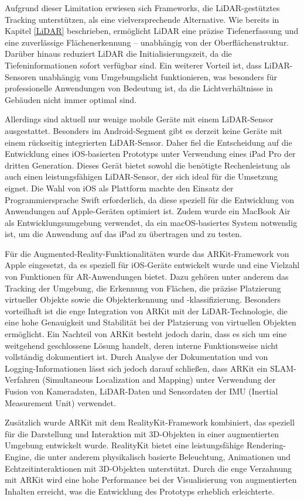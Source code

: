 Aufgrund dieser Limitation erwiesen sich Frameworks, die LiDAR-gestütztes Tracking unterstützen, als eine vielversprechende Alternative. Wie bereits in Kapitel \ref{LiDAR} beschrieben, ermöglicht LiDAR eine präzise Tiefenerfassung und eine zuverlässige Flächenerkennung – unabhängig von der Oberflächenstruktur. Darüber hinaus reduziert LiDAR die Initialisierungszeit, da die Tiefeninformationen sofort verfügbar sind. Ein weiterer Vorteil ist, dass LiDAR-Sensoren unabhängig vom Umgebungslicht funktionieren, was besonders für professionelle Anwendungen von Bedeutung ist, da die Lichtverhältnisse in Gebäuden nicht immer optimal sind.

Allerdings sind aktuell nur wenige mobile Geräte mit einem LiDAR-Sensor ausgestattet. Besonders im Android-Segment gibt es derzeit keine Geräte mit einem rückseitig integrierten LiDAR-Sensor. Daher fiel die Entscheidung auf die Entwicklung eines iOS-basierten Prototyps unter Verwendung eines iPad Pro der dritten Generation. Dieses Gerät bietet sowohl die benötigte Rechenleistung als auch einen leistungsfähigen LiDAR-Sensor, der sich ideal für die Umsetzung eignet. Die Wahl von iOS als Plattform machte den Einsatz der Programmiersprache Swift erforderlich, da diese speziell für die Entwicklung von Anwendungen auf Apple-Geräten optimiert ist. Zudem wurde ein MacBook Air als Entwicklungsumgebung verwendet, da ein macOS-basiertes System notwendig ist, um die Anwendung auf das iPad zu übertragen und zu testen.

Für die Augmented-Reality-Funktionalitäten wurde das ARKit-Framework von Apple eingesetzt, da es speziell für iOS-Geräte entwickelt wurde und eine Vielzahl von Funktionen für AR-Anwendungen bietet. Dazu gehören unter anderem das Tracking der Umgebung, die Erkennung von Flächen, die präzise Platzierung virtueller Objekte sowie die Objekterkennung und -klassifizierung. Besonders vorteilhaft ist die enge Integration von ARKit mit der LiDAR-Technologie, die eine hohe Genauigkeit und Stabilität bei der Platzierung von virtuellen Objekten ermöglicht. Ein Nachteil von ARKit besteht jedoch darin, dass es sich um eine weitgehend geschlossene Lösung handelt, deren interne Funktionsweise nicht vollständig dokumentiert ist. Durch Analyse der Dokumentation und von Logging-Informationen lässt sich jedoch darauf schließen, dass ARKit ein SLAM-Verfahren (Simultaneous Localization and Mapping) unter Verwendung der Fusion von Kameradaten, LiDAR-Daten und Sensordaten der IMU (Inertial Measurement Unit) verwendet.

Zusätzlich wurde ARKit mit dem RealityKit-Framework kombiniert, das speziell für die Darstellung und Interaktion mit 3D-Objekten in einer augmentierten Umgebung entwickelt wurde. RealityKit bietet eine leistungsfähige Rendering-Engine, die unter anderem physikalisch basierte Beleuchtung, Animationen und Echtzeitinteraktionen mit 3D-Objekten unterstützt. Durch die enge Verzahnung mit ARKit wird eine hohe Performance bei der Visualisierung von augmentierten Inhalten erreicht, was die Entwicklung des Prototyps erheblich erleichterte.

